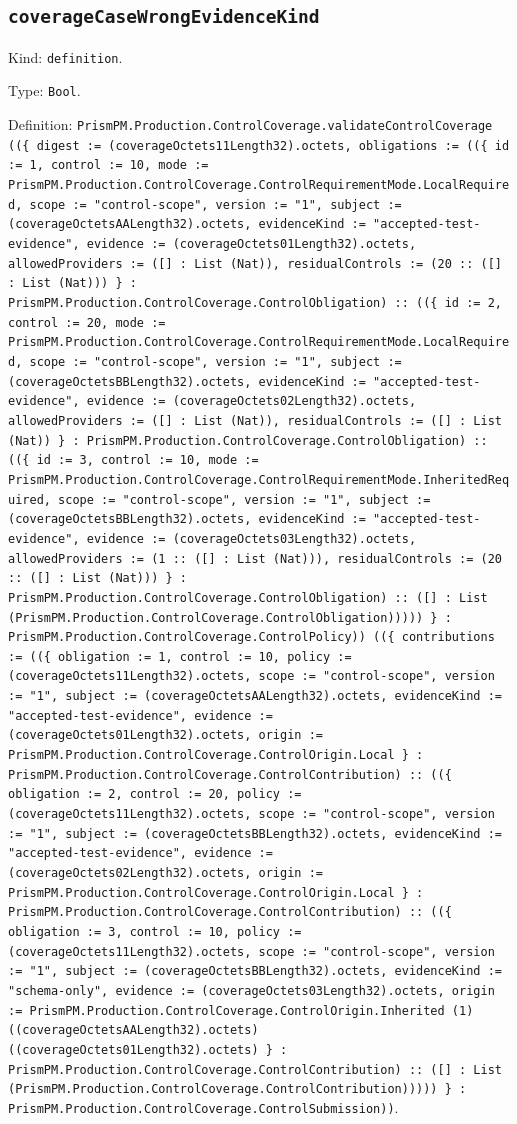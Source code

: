\documentclass[11pt]{article}
\begin{document}
\subsection*{\texttt{coverageCaseWrongEvidenceKind}}
\noindent Kind: \texttt{definition}.\par
\noindent Type: \texttt{Bool}.\par
\noindent Definition: \texttt{PrismPM.Production.ControlCoverage.validateControlCoverage ((\{ digest := (coverageOctets11Length32).octets, obligations := ((\{ id := 1, control := 10, mode := PrismPM.Production.ControlCoverage.ControlRequirementMode.LocalRequired, scope := "control-scope", version := "1", subject := (coverageOctetsAALength32).octets, evidenceKind := "accepted-test-evidence", evidence := (coverageOctets01Length32).octets, allowedProviders := ([] : List (Nat)), residualControls := (20 :: ([] : List (Nat))) \} : PrismPM.Production.ControlCoverage.ControlObligation) :: ((\{ id := 2, control := 20, mode := PrismPM.Production.ControlCoverage.ControlRequirementMode.LocalRequired, scope := "control-scope", version := "1", subject := (coverageOctetsBBLength32).octets, evidenceKind := "accepted-test-evidence", evidence := (coverageOctets02Length32).octets, allowedProviders := ([] : List (Nat)), residualControls := ([] : List (Nat)) \} : PrismPM.Production.ControlCoverage.ControlObligation) :: ((\{ id := 3, control := 10, mode := PrismPM.Production.ControlCoverage.ControlRequirementMode.InheritedRequired, scope := "control-scope", version := "1", subject := (coverageOctetsBBLength32).octets, evidenceKind := "accepted-test-evidence", evidence := (coverageOctets03Length32).octets, allowedProviders := (1 :: ([] : List (Nat))), residualControls := (20 :: ([] : List (Nat))) \} : PrismPM.Production.ControlCoverage.ControlObligation) :: ([] : List (PrismPM.Production.ControlCoverage.ControlObligation))))) \} : PrismPM.Production.ControlCoverage.ControlPolicy)) ((\{ contributions := ((\{ obligation := 1, control := 10, policy := (coverageOctets11Length32).octets, scope := "control-scope", version := "1", subject := (coverageOctetsAALength32).octets, evidenceKind := "accepted-test-evidence", evidence := (coverageOctets01Length32).octets, origin := PrismPM.Production.ControlCoverage.ControlOrigin.Local \} : PrismPM.Production.ControlCoverage.ControlContribution) :: ((\{ obligation := 2, control := 20, policy := (coverageOctets11Length32).octets, scope := "control-scope", version := "1", subject := (coverageOctetsBBLength32).octets, evidenceKind := "accepted-test-evidence", evidence := (coverageOctets02Length32).octets, origin := PrismPM.Production.ControlCoverage.ControlOrigin.Local \} : PrismPM.Production.ControlCoverage.ControlContribution) :: ((\{ obligation := 3, control := 10, policy := (coverageOctets11Length32).octets, scope := "control-scope", version := "1", subject := (coverageOctetsBBLength32).octets, evidenceKind := "schema-only", evidence := (coverageOctets03Length32).octets, origin := PrismPM.Production.ControlCoverage.ControlOrigin.Inherited (1) ((coverageOctetsAALength32).octets) ((coverageOctets01Length32).octets) \} : PrismPM.Production.ControlCoverage.ControlContribution) :: ([] : List (PrismPM.Production.ControlCoverage.ControlContribution))))) \} : PrismPM.Production.ControlCoverage.ControlSubmission))}.\par
\end{document}
